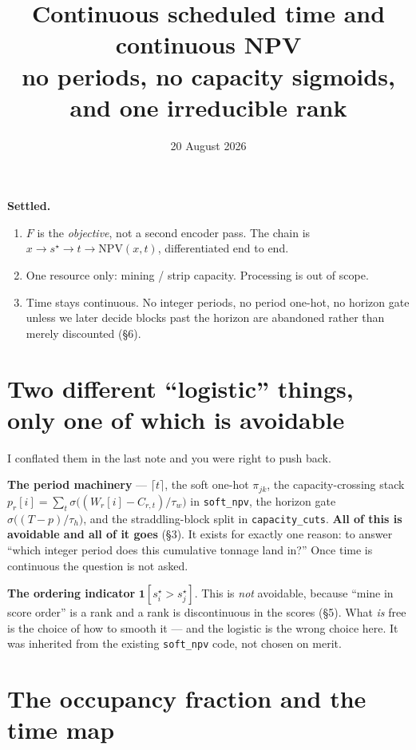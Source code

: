\documentclass[11pt,a4paper]{article}
\title{\bfseries Continuous scheduled time and continuous NPV\\[2pt]
\large no periods, no capacity sigmoids, and one irreducible rank}
\author{}
\date{20 August 2026}
\newcommand{\ind}[1]{\mathbf{1}\!\left[#1\right]}
\newcommand{\sstar}{s^{\star}}
\theoremstyle{definition}
\begin{document}
\maketitle
\vspace{-2.5em}

\begin{framed}
\noindent\textbf{Settled.}
\begin{enumerate}[leftmargin=1.6em,itemsep=1pt,topsep=2pt]
  \item $F$ is the \emph{objective}, not a second encoder pass. The chain is
        $x \to \sstar \to t \to \mathrm{NPV}(x,t)$, differentiated end to end.
  \item One resource only: mining / strip capacity. Processing is out of scope.
  \item Time stays continuous. No integer periods, no period one-hot, no horizon gate
        unless we later decide blocks past the horizon are abandoned rather than merely
        discounted (\S6).
\end{enumerate}
\end{framed}

\section{Two different ``logistic'' things, only one of which is avoidable}

I conflated them in the last note and you were right to push back.

\medskip
\noindent\textbf{The period machinery} --- $\lceil t \rceil$, the soft one-hot $\pi_{jk}$, the
capacity-crossing stack $p_r[i] = \sum_t \sigma\big((W_r[i]-C_{r,t})/\tau_w\big)$ in
\texttt{soft\_npv}, the horizon gate $\sigma\big((T-p)/\tau_h\big)$, and the straddling-block split
in \texttt{capacity\_cuts}. \textbf{All of this is avoidable and all of it goes} (\S3). It exists
for exactly one reason: to answer ``which integer period does this cumulative tonnage land in?''
Once time is continuous the question is not asked.

\medskip
\noindent\textbf{The ordering indicator} $\ind{\sstar_i > \sstar_j}$. This is \emph{not}
avoidable, because ``mine in score order'' is a rank and a rank is discontinuous in the scores
(\S5). What \emph{is} free is the choice of how to smooth it --- and the logistic is the wrong
choice here. It was inherited from the existing \texttt{soft\_npv} code, not chosen on merit.

\section{The occupancy fraction and the time map}
\end{document}
